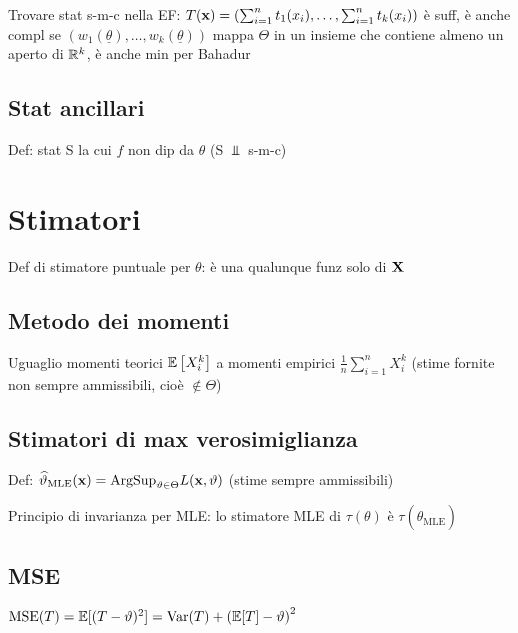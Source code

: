 Trovare stat s-m-c nella EF: $T(\mathbf{x})=\left(\sum_{i=1}^n t_1(x_i),\dots,\sum_{i=1}^n t_k(x_i)\right)$ è suff, è anche compl se $\left(w_1(\underline{\theta}),\dots,w_k(\underline{\theta})\right)$ mappa $\Theta$ in un insieme che contiene almeno un aperto di $\mathbb{R}^k$, è anche min per Bahadur

\subsection{Stat ancillari}

Def: stat S la cui $f$ non dip da $\theta$ (S $\Bot$ s-m-c)


\section{Stimatori}


Def di stimatore puntuale per $\theta$: è una qualunque funz solo di $\mathbf{X}$  

\subsection{Metodo dei momenti}

Uguaglio momenti teorici $\mathbb{E}\left[X_i^k\right]$ a momenti empirici $\frac{1}{n}\sum_{i=1}^n X_i^k$ (stime fornite non sempre ammissibili, cioè $\notin \Theta$)

\subsection{Stimatori di max verosimiglianza}

Def: $\widehat{\vartheta}_{\text{MLE}}(\mathbf{x})=\text{ArgSup}_{\vartheta\in\Theta} L(\mathbf{x},\vartheta)$ (stime sempre ammissibili)

\smallskip

Principio di invarianza per MLE: lo stimatore MLE di $\tau(\theta)$ è $\tau\left(\hat{\theta}_{\text{MLE}}\right)$

\subsection{MSE}

$\text{MSE}(T)=\mathbb{E}[(T-\vartheta)^2]=\text{Var}(T)+\left(\mathbb{E}[T]-\vartheta\right)^2$

\smallskip

